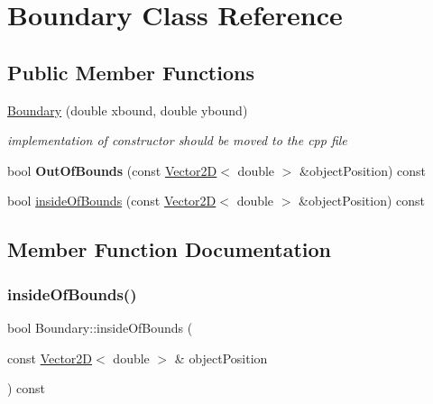 \hypertarget{class_boundary}{}\section{Boundary Class Reference}
\label{class_boundary}
\subsection*{Public Member Functions}
\begin{DoxyCompactItemize}
\item 
\mbox{\label{class_boundary_a1ebdbcf1f4bfc6c98ec89e0f15754a59}} 
\hyperlink{class_boundary_a1ebdbcf1f4bfc6c98ec89e0f15754a59}{Boundary} (double xbound, double ybound)
\begin{DoxyCompactList}\small\item\em implementation of constructor should be moved to the cpp file \end{DoxyCompactList}\item 
\mbox{\label{class_boundary_a9c6a5bbcb06d977512fb871f1ab86f5b}} 
bool {\bfseries Out\+Of\+Bounds} (const \hyperlink{class_vector2_d}{Vector2D}$<$ double $>$ \&object\+Position) const
\item 
bool \hyperlink{class_boundary_aeb7b795c19f8ad23d8509444a33d473c}{inside\+Of\+Bounds} (const \hyperlink{class_vector2_d}{Vector2D}$<$ double $>$ \&object\+Position) const
\end{DoxyCompactItemize}


\subsection{Member Function Documentation}
\mbox{\label{class_boundary_aeb7b795c19f8ad23d8509444a33d473c}} 
\subsubsection{\texorpdfstring{inside\+Of\+Bounds()}{insideOfBounds()}}
{\footnotesize\ttfamily bool Boundary\+::inside\+Of\+Bounds (\begin{DoxyParamCaption}\item[{const \hyperlink{class_vector2_d}{Vector2D}$<$ double $>$ \&}]{object\+Position }\end{DoxyParamCaption}) const}

